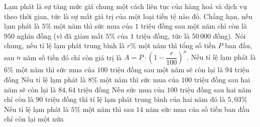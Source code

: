 \begin{ex}%
	Lạm phát là sự tăng mức giá chung một cách liên tục của hàng hoá và dịch vụ theo thời gian, tức là sự mất giá trị của một loại tiền tệ nào đó. Chẳng hạn, nếu lạm phát là $5\%$ một năm thì sức mua của $1$ triệu đồng sau một năm chỉ còn là $950$ nghìn đồng (vì đã giảm mất $5\%$ của $1$ triệu đồng, tức là $50\,000$ đồng). Nói chung, nếu tỉ lệ lạm phát trung bình là $r\%$  một năm thì tổng số tiền $P$ ban đầu, sau $n$ năm số tiền đó chỉ còn giá trị là $A=P \cdot\left(1-\dfrac{r}{100}\right)^n$.
	 \choiceTF
		{\True Nếu  tỉ lệ lạm phát là $6\%$ một năm thì sức mua của $100$ triệu đồng sau một năm sẽ còn lại là $94$ triệu đồng}
		{\True Nếu tỉ lệ  lạm phát là $8\%$ một năm thì sức mua của $100$ triệu đồng sau hai năm sẽ còn lại là $84{,}64$ triệu đồng}
		{Nếu sức mua của $100$ triệu đồng sau hai năm chỉ còn là $90$ triệu đồng thì  tỉ lệ lạm phát trung bình của hai năm đó là $5{,}03\%$}
		{Nếu tỉ lệ lạm phát là $5\%$ một năm thì sau $14$  năm sức mua của số tiền ban đầu chỉ còn lại một nửa}
\end{ex}


